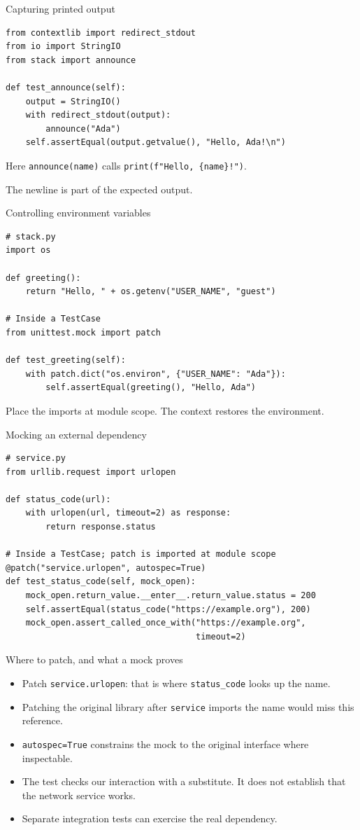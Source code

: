 \documentclass[aspectratio=169,11pt]{beamer}
\newcommand{\code}[1]{\texttt{#1}}
\begin{document}
\begin{frame}[fragile]{Capturing printed output}
\begin{lstlisting}
from contextlib import redirect_stdout
from io import StringIO
from stack import announce

def test_announce(self):
    output = StringIO()
    with redirect_stdout(output):
        announce("Ada")
    self.assertEqual(output.getvalue(), "Hello, Ada!\n")
\end{lstlisting}
Here \code{announce(name)} calls \code{print(f"Hello, \{name\}!")}.

The newline is part of the expected output.
\end{frame}

\begin{frame}[fragile]{Controlling environment variables}
\begin{lstlisting}
# stack.py
import os

def greeting():
    return "Hello, " + os.getenv("USER_NAME", "guest")

# Inside a TestCase
from unittest.mock import patch

def test_greeting(self):
    with patch.dict("os.environ", {"USER_NAME": "Ada"}):
        self.assertEqual(greeting(), "Hello, Ada")
\end{lstlisting}
Place the imports at module scope. The context restores the environment.
\end{frame}

\begin{frame}[fragile]{Mocking an external dependency}
\begin{lstlisting}
# service.py
from urllib.request import urlopen

def status_code(url):
    with urlopen(url, timeout=2) as response:
        return response.status

# Inside a TestCase; patch is imported at module scope
@patch("service.urlopen", autospec=True)
def test_status_code(self, mock_open):
    mock_open.return_value.__enter__.return_value.status = 200
    self.assertEqual(status_code("https://example.org"), 200)
    mock_open.assert_called_once_with("https://example.org",
                                      timeout=2)
\end{lstlisting}
\end{frame}

\begin{frame}[fragile]{Where to patch, and what a mock proves}
\begin{itemize}
\item Patch \code{service.urlopen}: that is where \code{status\_code} looks up the name.
\item Patching the original library after \code{service} imports the name would miss this reference.
\item \code{autospec=True} constrains the mock to the original interface where inspectable.
\item The test checks our interaction with a substitute. It does not establish that the network service works.
\item Separate integration tests can exercise the real dependency.
\end{itemize}
\end{frame}
\end{document}
